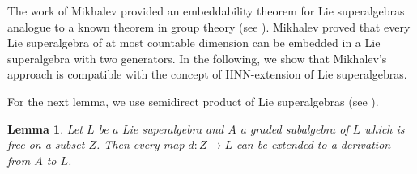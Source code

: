 \documentclass[reqno]{amsart}
\newtheorem{lemma}[theorem]{Lemma}
\theoremstyle{definition}
\theoremstyle{remark}
\numberwithin{equation}{section}
\begin{document}
The work \cite{M2} of Mikhalev provided an embeddability theorem for Lie superalgebras analogue to a known theorem in group theory (see \cite{H1}).
Mikhalev proved that every Lie superalgebra of at most countable dimension can be embedded in a Lie superalgebra with two generators. In the following, we show that Mikhalev's approach is compatible with the concept of HNN-extension of Lie superalgebras.

For the next lemma, we use semidirect product of Lie superalgebras (see \cite{M1}).

\begin{lemma}
Let $L$ be a Lie superalgebra and $A$ a graded subalgebra of $L$ which is free on a subset $Z$. Then every map $d \colon Z \to L$ can be extended to a derivation from $A$ to $L$.
\end{lemma}
\end{document}
